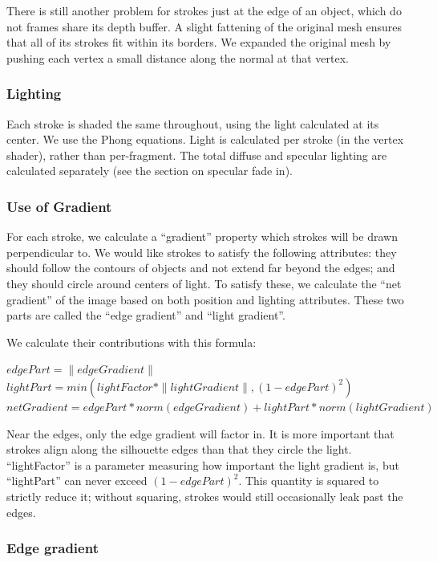 \documentclass[conference]{acmsiggraph}
\begin{document}
There is still another problem for strokes just at the edge of an object, which
do not frames share its depth buffer. A slight fattening of the original mesh
ensures that all of its strokes fit within its borders. We expanded the
original mesh by pushing each vertex a small distance along the normal at that
vertex.

\subsubsection{Lighting}

Each stroke is shaded the same throughout, using the light calculated at its
center. We use the Phong equations. Light is calculated per stroke (in the
vertex shader), rather than per-fragment. The total diffuse and specular
lighting are calculated separately (see the section on specular fade in).


\subsubsection{Use of Gradient}

For each stroke, we calculate a ``gradient'' property which strokes will be
drawn perpendicular to. We would like strokes to satisfy the following
attributes: they should follow the contours of objects and not extend far
beyond the edges; and they should circle around centers of light. To satisfy
these, we calculate the ``net gradient'' of the image based on both position
and lighting attributes. These two parts are called the ``edge gradient'' and
``light gradient''.

We calculate their contributions with this formula:

  $edgePart = \| edgeGradient \|$ \\
  $lightPart = min(lightFactor * \| lightGradient \| , (1 - edgePart)^2)$ \\
  $netGradient = edgePart * norm(edgeGradient) + lightPart * norm(lightGradient)$

Near the edges, only the edge gradient will factor in. It is more important
that strokes align along the silhouette edges than that they circle the light.
``lightFactor'' is a parameter measuring how important the light gradient is,
but ``lightPart'' can never exceed $(1 - edgePart)^2$. This quantity is squared
to strictly reduce it; without squaring, strokes would still occasionally leak
past the edges.


\subsubsection{Edge gradient}
\end{document}
